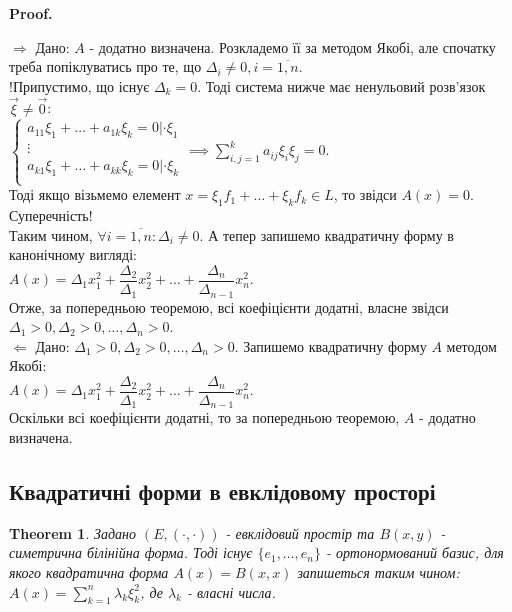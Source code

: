 \documentclass[a4paper, 10pt]{article}
\makeatletter
\def\rightproof{$\boxed{\Rightarrow}$ }
\def\leftproof{$\boxed{\Leftarrow}$ }
\theoremstyle{theoremdd}
\newtheorem{theorem}{Theorem}[subsection]
\renewenvironment{proof}[1][Proof.\\]{\par
\pushQED{\hfill \qed}%
\normalfont \topsep6\p@\@plus6\p@\relax
\trivlist
\item\relax
{\bfseries
#1\@addpunct{.}}\hspace\labelsep\ignorespaces
}{%
\popQED\endtrivlist\@endpefalse
}
\makeatother
\begin{document}
\begin{proof}
\rightproof Дано: $A$ - додатно визначена. Розкладемо її за методом Якобі, але спочатку треба попіклуватись про те, що $\Delta_i \neq 0, i = \overline{1,n}$.\\
!Припустимо, що існує $\Delta_k = 0$. Тоді система нижче має ненульовий розв'язок $\vec{\xi} \neq \vec{0}$:\\
$\begin{cases}
a_{11}\xi_1 + \dots + a_{1k}\xi_k = 0 | \cdot \xi_1 \\
\vdots \\
a_{k1}\xi_1 + \dots + a_{kk}\xi_k = 0 | \cdot \xi_k \\
\end{cases} \implies \displaystyle\sum_{i,j=1}^k a_{ij}\xi_i \xi_j = 0$.\\
Тоді якщо візьмемо елемент $x = \xi_1 f_1 + \dots + \xi_k f_k \in L$, то звідси $A(x) = 0$. Суперечність!\\
Таким чином, $\forall i=\overline{1,n}: \Delta_i \neq 0$. А тепер запишемо квадратичну форму в канонічному вигляді:\\
$A(x) = \Delta_1 x_1^2 + \dfrac{\Delta_2}{\Delta_1} x_2^2 + \dots + \dfrac{\Delta_n}{\Delta_{n-1}} x_n^2$.\\
Отже, за попередньою теоремою, всі коефіцієнти додатні, власне звідси $\Delta_1>0,\Delta_2>0,\dots,\Delta_n>0$.
\bigskip \\
\leftproof Дано: $\Delta_1>0,\Delta_2>0,\dots,\Delta_n>0$. Запишемо квадратичну форму $A$ методом Якобі:\\
$A(x) = \Delta_1 x_1^2 + \dfrac{\Delta_2}{\Delta_1} x_2^2 + \dots + \dfrac{\Delta_n}{\Delta_{n-1}} x_n^2$.\\
Оскільки всі коефіцієнти додатні, то за попередньою теоремою, $A$ - додатно визначена.
\end{proof}

\subsection{Квадратичні форми в евклідовому просторі}
\begin{theorem}
Задано $(E,(\cdot,\cdot))$ - евклідовий простір та $B(x,y)$ - симетрична білінійна форма. Тоді існує $\{e_1,\dots,e_n\}$ - ортонормований базис, для якого квадратична форма $A(x) = B(x,x)$ запишеться таким чином:\\
$A(x) = \displaystyle\sum_{k=1}^n \lambda_k \xi_k^2$, де $\lambda_k$ - власні числа.
\end{theorem}
\end{document}
